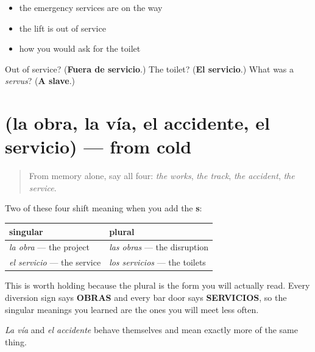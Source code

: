 \begin{itemize}
\raggedright
  \item the emergency services are on the way
  \item the lift is out of service
  \item how you would ask for the toilet
\end{itemize}

\begin{tcolorbox}[breakable,colback=teal!4,colframe=teal!35!black,title={Before you move on}]
Out of service? (\textbf{Fuera de servicio}.) The toilet? (\textbf{El servicio}.) What was a \emph{servus}? (\textbf{A slave}.)
\end{tcolorbox}
\section[(la obra, la vía, el accidente, el …]{(la obra, la vía, el accidente, el servicio) — from cold}

\label{lesson:ES-R454-repaso-corte}



\begin{quote}
From memory alone, say all four: \emph{the works}, \emph{the track}, \emph{the accident}, \emph{the service}.
\end{quote}

\begin{grammarlens}[title={Grammar Lens: the plural is not always more of the same}]
Two of these four shift meaning when you add the \textbf{s}:

\noindent
\begin{tabularx}{\linewidth}{@{}>{\raggedright\arraybackslash}X>{\raggedright\arraybackslash}X@{}}
\toprule
\textbf{singular} & \textbf{plural} \\
\midrule
\emph{la obra} — the project & \emph{las obras} — the disruption \\
\emph{el servicio} — the service & \emph{los servicios} — the toilets \\
\bottomrule
\end{tabularx}

This is worth holding because the plural is the form you will actually read. Every diversion sign says \textbf{OBRAS} and every bar door says \textbf{SERVICIOS}, so the singular meanings you learned are the ones you will meet less often.

\emph{La vía} and \emph{el accidente} behave themselves and mean exactly more of the same thing.
\end{grammarlens}

